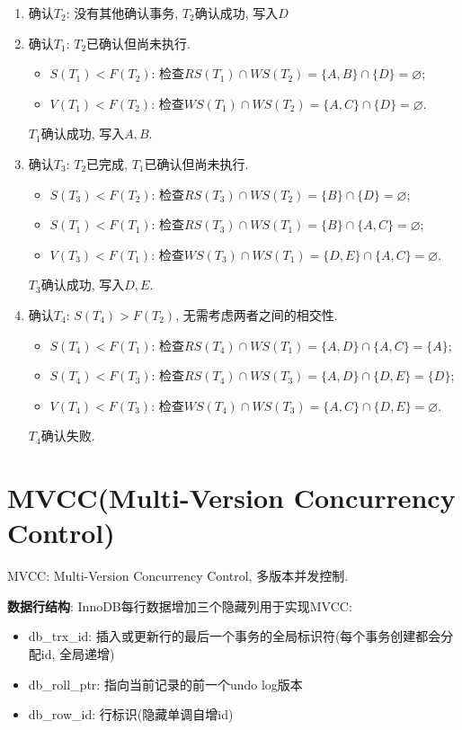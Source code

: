 \begin{solution}
  \begin{enumerate}
      \item 确认$T_2$: 没有其他确认事务, $T_2$确认成功, 写入$D$
      \item 确认$T_1$: $T_2$已确认但尚未执行.
      \begin{itemize}
        \item $S(T_1)<F(T_2)$: 检查$RS(T_1)\cap WS(T_2) = \{A,B\} \cap \{D\} = \varnothing$;
        \item $V(T_1)<F(T_2)$: 检查$WS(T_1)\cap WS(T_2) = \{A,C\} \cap \{D\} = \varnothing$.
      \end{itemize}
      $T_1$确认成功, 写入$A,B$.
      \item 确认$T_3$: $T_2$已完成, $T_1$已确认但尚未执行.
      \begin{itemize}
        \item $S(T_3)<F(T_2)$: 检查$RS(T_3)\cap WS(T_2) = \{B\} \cap \{D\} = \varnothing$;
        \item $S(T_1)<F(T_1)$: 检查$RS(T_3)\cap WS(T_1) = \{B\} \cap \{A,C\} = \varnothing$;
        \item $V(T_3)<F(T_1)$: 检查$WS(T_3)\cap WS(T_1) = \{D,E\} \cap \{A,C\} = \varnothing$.
      \end{itemize}
      $T_3$确认成功, 写入$D,E$.
      \item 确认$T_4$: $S(T_4)>F(T_2)$, 无需考虑两者之间的相交性.
      \begin{itemize}
        \item $S(T_4)<F(T_1)$: 检查$RS(T_4)\cap WS(T_1) = \{A,D\} \cap \{A,C\} = \{A\}$;
        \item $S(T_4)<F(T_3)$: 检查$RS(T_4)\cap WS(T_3) = \{A,D\} \cap \{D,E\} = \{D\}$;
        \item $V(T_4)<F(T_3)$: 检查$WS(T_4)\cap WS(T_3) = \{A,C\} \cap \{D,E\} = \varnothing$.
      \end{itemize}
      $T_4$确认失败.
  \end{enumerate}
\end{solution}

\section{MVCC(Multi-Version Concurrency Control)}

MVCC: Multi-Version Concurrency Control, 多版本并发控制.

\textbf{数据行结构}:
InnoDB每行数据增加三个隐藏列用于实现MVCC:
\begin{itemize}
  \item db\_trx\_id: 插入或更新行的最后一个事务的全局标识符(每个事务创建都会分配id, 全局递增)
  \item db\_roll\_ptr: 指向当前记录的前一个undo log版本
  \item db\_row\_id: 行标识(隐藏单调自增id)
\end{itemize}

